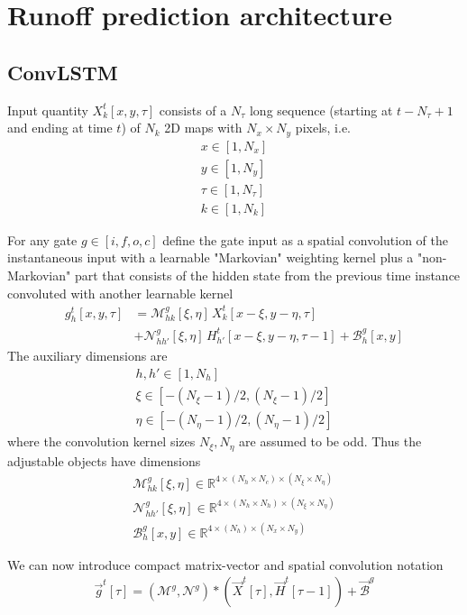 \documentclass[10pt,a4paper]{article}
\author{Sven Karsten}
\begin{document}
\section{Runoff prediction architecture}

\subsection{ConvLSTM}

Input quantity $ X^t_k[x, y, \tau]$ consists of a $N_\tau$ long sequence (starting at $t-N_\tau+1$ and ending at time $t$)  of $N_k$ 2D maps with $N_x \times N_y$ pixels, i.e.
\begin{align}
x \in [1,N_x] \\
y \in [1,N_y] \\
\tau \in [1,N_\tau] \\
k \in [1,N_k]
\end{align}

For any gate $g \in [i, f, o, c] $ define the gate input as a spatial convolution of the instantaneous input with a learnable "Markovian" weighting kernel plus a "non-Markovian" part that consists of the hidden state from the previous time instance convoluted with another learnable kernel  
\begin{align}
g^t_h[x,y,\tau] & =  \mathcal{M}^{g}_{hk} [\xi,\eta]\, X^t_k[x-\xi, y-\eta, \tau] \\
& +  \mathcal{N}^{g}_{hh'}[\xi,\eta] \, H^t_{h'}[x-\xi, y-\eta, \tau-1] + \mathcal{B}^g_{h}[x,y]
\end{align}
%
The auxiliary dimensions are
\begin{align}
h,h' \in [1,N_h] \\
\xi\in [-(N_\xi-1)/2,(N_\xi-1)/2]\\
\eta\in [-(N_\eta-1)/2,(N_\eta-1)/2]
\end{align}
%
where the convolution kernel sizes $N_\xi, N_\eta$ are assumed to be odd.
%
Thus the adjustable objects have dimensions
\begin{align}
\mathcal{M}^{g}_{hk}[\xi,\eta] \in \mathbb{R}^{4\times(N_h\times N_c) \times(N_\xi \times N_\eta)} \\
\mathcal{N}^{g}_{hh'}[\xi,\eta] \in \mathbb{R}^{4\times(N_h\times N_h) \times (N_\xi \times N_\eta)} \\
\mathcal{B}^g_{h}[x,y] \in \mathbb{R}^{4 \times(N_h) \times (N_x\times N_y) }
\end{align}

%
We can now introduce compact matrix-vector and spatial convolution notation
\begin{align}
\vec{g}^t[\tau] = \left(\pmb{\mathcal{M}}^{g}, \pmb{\mathcal{N}}^{g}\right) \ast \left(\vec{X}^t[\tau], \vec{H}^t[ \tau-1]\right)+ \vec{\mathcal{B}}^g
\end{align}
\end{document}
